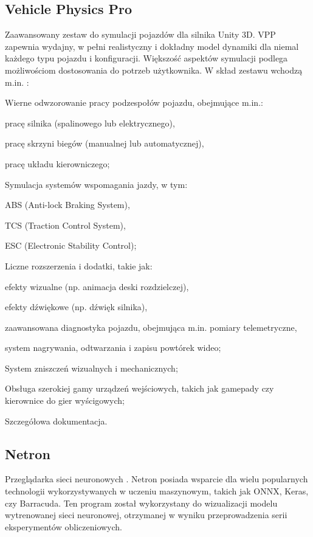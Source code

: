 \subsection{Vehicle Physics Pro}
\label{VppSection}
Zaawansowany zestaw do symulacji pojazdów dla silnika Unity 3D. VPP zapewnia wydajny, w pełni realistyczny i dokładny model dynamiki dla niemal każdego typu pojazdu i konfiguracji. Większość aspektów symulacji podlega możliwościom dostosowania do potrzeb użytkownika. W skład zestawu wchodzą m.in. \cite{vpp:features}:
\begin{enumerate*}
\item Wierne odwzorowanie pracy podzespołów pojazdu, obejmujące m.in.:
\begin{itemize*}
\item pracę silnika (spalinowego lub elektrycznego),
\item pracę skrzyni biegów (manualnej lub automatycznej),
\item pracę układu kierowniczego;
\end{itemize*}
\item Symulacja systemów wspomagania jazdy, w tym:
\begin{itemize*}
\item ABS (Anti-lock Braking System),
\item TCS (Traction Control System),
\item ESC (Electronic Stability Control);
\end{itemize*}
\item Liczne rozszerzenia i dodatki, takie jak:
\begin{itemize*}
\item efekty wizualne (np. animacja deski rozdzielczej),
\item efekty dźwiękowe (np. dźwięk silnika),
\item zaawansowana diagnostyka pojazdu, obejmująca m.in. pomiary telemetryczne,
\item system nagrywania, odtwarzania i zapisu powtórek wideo;
\end{itemize*}
\item System zniszczeń wizualnych i mechanicznych;
\item Obsługa szerokiej gamy urządzeń wejściowych, takich jak gamepady czy kierownice do gier wyścigowych;
\item Szczegółowa dokumentacja.
\end{enumerate*}

\subsection{Netron}
\label{NetronOpis}
Przeglądarka sieci neuronowych \cite{netron:github}. Netron posiada wsparcie dla wielu popularnych technologii wykorzystywanych w uczeniu maszynowym, takich jak ONNX, Keras, czy Barracuda. Ten program został wykorzystany do wizualizacji modelu wytrenowanej sieci neuronowej, otrzymanej w wyniku przeprowadzenia serii eksperymentów obliczeniowych.

